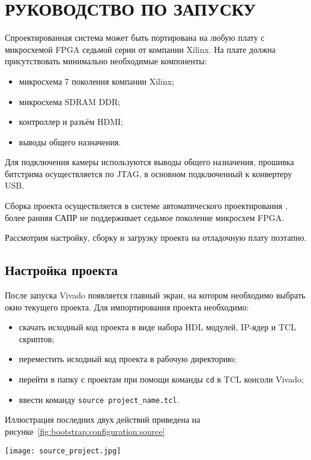 \section{РУКОВОДСТВО ПО ЗАПУСКУ}
\label{sec:bootstrap}

Спроектированная система может быть портирована на любую плату с
микросхемой FPGA седьмой серии от компании Xilinx. На плате
должна присутствовать минимально необходимые компоненты:
\begin{itemize}
  \item микросхема 7 поколения компании Xilinx;
  \item микросхема SDRAM DDR;
  \item контроллер и разъём HDMI;
  \item выводы общего назначения.
\end{itemize}

Для подключения камеры используются выводы общего назначения,
прошивка битстрима осуществляется по JTAG, в основном
подключенный к конвертеру USB.

Сборка проекта осуществляется в системе автоматического проектирования
, более ранняя САПР  не поддерживает
седьмое поколение микросхем FPGA.

Рассмотрим настройку, сборку и загрузку проекта на отладочную плату
поэтапно.

\subsection{Настройка проекта}
\label{sec:bootstrap:configuration}

После запуска Vivado появляется главный экран, на котором необходимо выбрать
окно текущего проекта. Для импортирования проекта необходимо:
\begin{itemize}
  \item скачать исходный код проекта в виде набора HDL модулей, IP-ядер и TCL скриптов;
  \item переместить исходный код проекта в рабочую директорию;
  \item перейти в папку с проектам при помощи команды \texttt{cd} в TCL консоли Vivado;
  \item ввести команду \texttt{source project\_name.tcl}.
\end{itemize}

Иллюстрация последних двух действий приведена на рисунке~\ref{fig:bootstrap:configuration:source}

\begin{center}
  \centering
  \texttt{[image: source\_project.jpg]}
  \label{fig:bootstrap:configuration:source}
\end{center}

